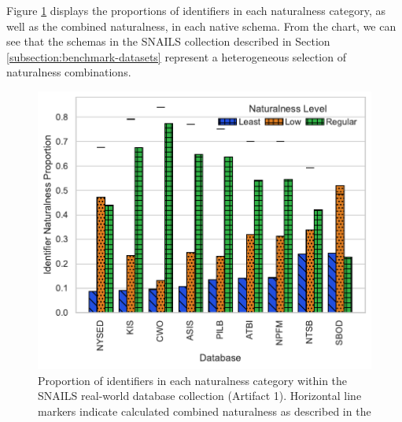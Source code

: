 Figure \ref{fig:databasenaturalness} displays the proportions of identifiers in each naturalness category, as well as the combined naturalness, in each native schema.
From the chart, we can see that the schemas in the SNAILS collection described in Section \ref{subsection:benchmark-datasets} represent a heterogeneous selection of naturalness combinations.

\begin{figure}
  \centering
  \includegraphics[width=\figwidthmod\linewidth]{figures/naturalness_by_db.pdf}
  \caption{Proportion of identifiers in each naturalness category within the SNAILS real-world database collection (Artifact 1). Horizontal line markers indicate calculated combined naturalness as described in the \fi}
  \label{fig:databasenaturalness}
\end{figure}

